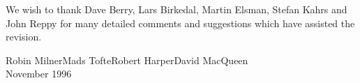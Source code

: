 

We wish to thank Dave Berry, Lars Birkedal, Martin Elsman, Stefan Kahrs
and John Reppy for many detailed comments and suggestions which have assisted
the revision.

\begin{flushright}
Robin Milner\quad Mads Tofte\quad Robert Harper\quad David MacQueen\\[1cm]
November 1996
\end{flushright}

\newpage
{}



